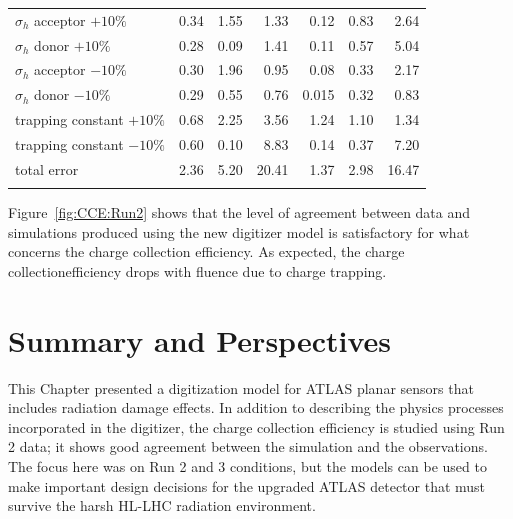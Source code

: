 \begin{table}[!htpb]
\begin{center}
{\begin{tabular*}{0.7\textwidth}{@{\extracolsep{\fill}}lrrrrrr}
\noalign{\smallskip}\hline\noalign{\smallskip}

$\sigma_h$ acceptor $+10\%$  	& 0.34  	& 1.55  & 1.33 & 0.12 & 0.83  & 2.64\\
$\sigma_h$  donor $+10\%$  		& 0.28  	& 0.09  & 1.41 & 0.11 & 0.57  &5.04\\
$\sigma_h$  acceptor $-10\%$  	& 0.30  	& 1.96  & 0.95 & 0.08 & 0.33  &2.17\\
$\sigma_h$  donor $-10\%$ 			& 0.29  	& 0.55  & 0.76 & 0.015  & 0.32  &0.83 \\
\noalign{\smallskip}\hline\noalign{\smallskip}
trapping constant $+10\%$ 			& 0.68  	& 2.25  & 3.56 & 1.24 & 1.10 & 1.34 \\
trapping constant $-10\%$  			& 0.60  	& 0.10  & 8.83 & 0.14 & 0.37 &  7.20\\
\noalign{\smallskip}\hline\noalign{\smallskip}
total error 					& 2.36		& 5.20 & 20.41 & 1.37 & 2.98  &16.47\\
\noalign{\smallskip}\hline\noalign{\smallskip}
\end{tabular*}
}
\end{center}

\end{table} 

Figure~\ref{fig:CCE:Run2} shows that the level of agreement between data and simulations produced using 
the new digitizer model is 
satisfactory for what concerns the charge collection efficiency. As expected, the  charge collectionefficiency 
drops with fluence due to charge trapping.  



\section{Summary and Perspectives}
\label{sec:digiconclusions}



This Chapter presented a digitization model for ATLAS planar  sensors that includes radiation damage effects.  In addition to describing the physics processes incorporated in the digitizer, the charge 
collection efficiency is studied using Run 2 data; it shows good agreement between the simulation and the observations. The focus here was on Run 2 and 3 conditions, but the models can be used to make important design decisions for the upgraded ATLAS detector that must survive the harsh HL-LHC radiation environment.


